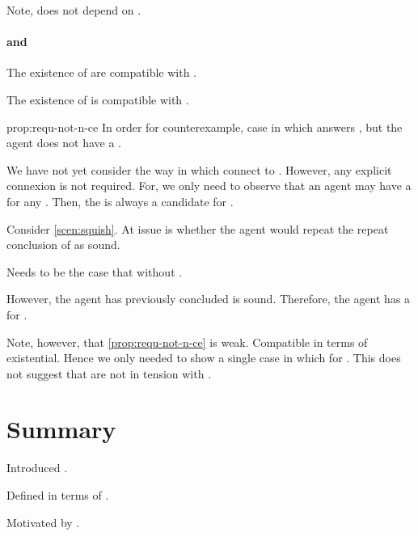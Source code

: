 \begin{note}
  Note, does not depend on .
\end{note}


\paragraph*{ and \issueConstraint{}}

\begin{note}
  The existence of  are compatible with \issueConstraint{}.

  \begin{observation}
    \label{prop:requ-not-n-ce}
    The existence of  is compatible with \issueConstraint{}.
  \end{observation}

  \begin{motivation}{prop:requ-not-n-ce}
    In order for counterexample, case in which \ros{} answers \qWhyV{}, but the agent does not have a \wit{}.

    We have not yet consider the way in which  connect to \qWhyV{}.
    However, any explicit connexion is not required.
    For, we only need to observe that an agent may have a \wit{} for any \requ{}.
    Then, the \wit{} is always a candidate for \qHowV{}.

    Consider \autoref{scen:squish}.
    At issue is whether the agent would repeat the repeat conclusion of \sqE{} as sound.

    Needs to be the case that \ros{} without \wit{}.

    However, the agent has previously concluded \sqE{} is sound.
    Therefore, the agent has a \wit{} for \ros{}.
  \end{motivation}

  Note, however, that \autoref{prop:requ-not-n-ce} is weak.
  Compatible in terms of existential.
  Hence we only needed to show a single case in which \wit{} for \requ{}.
  This does not suggest that  are not in tension with \issueConstraint{}.
\end{note}

\section*{Summary}

\begin{note}
  Introduced .

  Defined in terms of \tC{}.

  Motivated by \tC{}.
\end{note}



